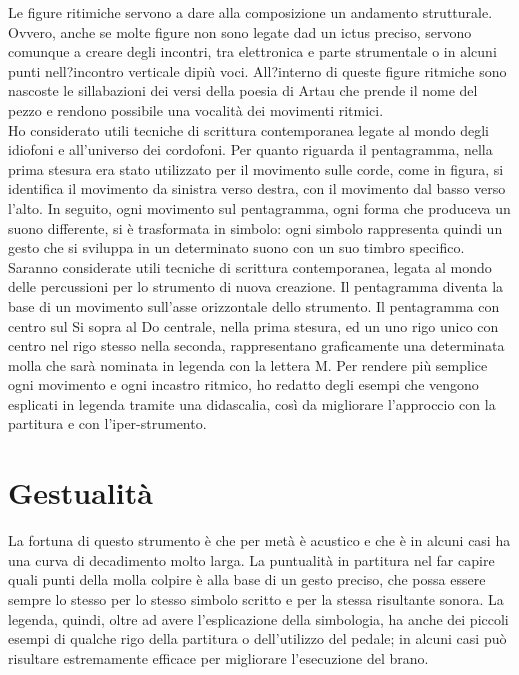 Le figure ritimiche servono a dare alla composizione un andamento strutturale. Ovvero, anche se molte figure non sono legate dad un ictus preciso, servono comunque a creare degli incontri, tra elettronica e parte strumentale o in alcuni punti nell?incontro verticale dipiù voci. All?interno di queste figure ritmiche sono nascoste le sillabazioni dei versi della poesia di Artau che prende il nome del pezzo e rendono possibile una vocalità dei movimenti ritmici. \\
Ho considerato utili tecniche di scrittura contemporanea legate al mondo degli idiofoni e all'universo dei cordofoni. Per quanto riguarda il pentagramma, nella prima stesura era stato utilizzato per il movimento sulle corde, come in figura, si identifica il movimento da sinistra verso destra, con il movimento dal basso verso l'alto. In seguito, ogni movimento sul pentagramma, ogni forma che produceva un suono differente, si è trasformata in simbolo: ogni simbolo rappresenta quindi un gesto che si sviluppa in un determinato suono con un suo timbro specifico.
Saranno considerate utili tecniche di scrittura contemporanea, legata al mondo delle percussioni per lo strumento di nuova creazione. Il pentagramma diventa la base di un movimento sull'asse orizzontale dello strumento. Il pentagramma con centro sul Si sopra al Do centrale, nella prima stesura, ed un uno rigo unico con centro nel rigo stesso nella seconda, rappresentano graficamente una determinata molla che sarà nominata in legenda con la lettera M. Per rendere più semplice ogni movimento e ogni incastro ritmico, ho redatto degli esempi che vengono esplicati in legenda tramite una didascalia, così da migliorare l'approccio con la partitura e con l'iper-strumento.

\section{Gestualità}


La fortuna di questo strumento è che per metà è acustico e che è in alcuni casi ha una curva di decadimento molto larga.
La puntualità in partitura nel far capire quali punti della molla colpire è alla base di un gesto preciso, che possa essere sempre lo stesso per lo stesso simbolo scritto e per la stessa risultante sonora. La legenda, quindi, oltre ad avere l'esplicazione della simbologia, ha anche dei piccoli esempi di qualche rigo della partitura o dell'utilizzo del pedale; in alcuni casi può risultare estremamente efficace per migliorare l'esecuzione del brano.


